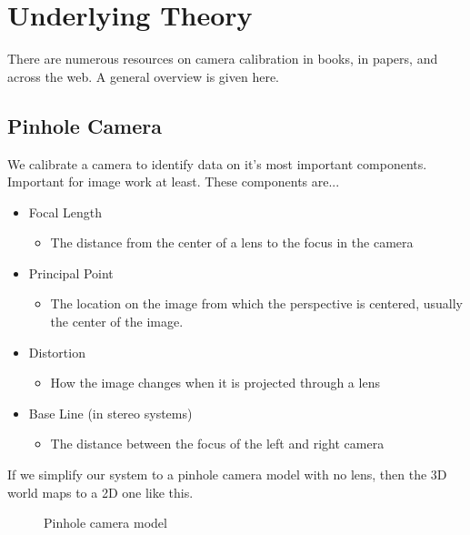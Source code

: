 \documentclass{article}
\begin{document}
\section{Underlying Theory}

There are numerous resources on camera calibration in books, in papers, and across the web. A general overview is given here.

\subsection{Pinhole Camera}

We calibrate a camera to identify data on it's most important components. Important for image work at least. These components are...

\begin{itemize}
	\item Focal Length
	\begin{itemize}
		\item The distance from the center of a lens to the focus in the camera
	\end{itemize}
	\item Principal Point
	\begin{itemize}
		\item The location on the image from which the perspective is centered, usually the center of the image.
	\end{itemize}
	\item Distortion 
	\begin{itemize}
		\item How the image changes when it is projected through a lens
	\end{itemize}
	\item Base Line (in stereo systems)
	\begin{itemize}
		\item The distance between the focus of the left and right camera
	\end{itemize}
\end{itemize}
	
If we simplify our system to a pinhole camera model with no lens, then the 3D world maps to a 2D one like this. 

\begin{figure}[h]
	\centering
	\caption{Pinhole camera model}
	\label{fig:pinhole}
\end{figure}
\end{document}
